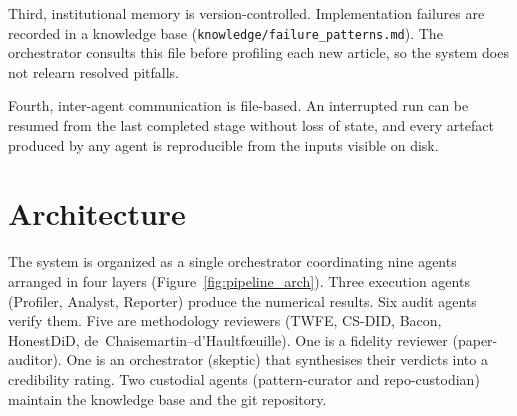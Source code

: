 Third, institutional memory is version-controlled. Implementation failures are recorded in a knowledge base (\texttt{knowledge/failure\_patterns.md}). The orchestrator consults this file before profiling each new article, so the system does not relearn resolved pitfalls.

Fourth, inter-agent communication is file-based. An interrupted run can be resumed from the last completed stage without loss of state, and every artefact produced by any agent is reproducible from the inputs visible on disk.


\section{Architecture}
\label{sec:appc_architecture}

The system is organized as a single orchestrator coordinating nine agents arranged in four layers (Figure~\ref{fig:pipeline_arch}). Three execution agents (Profiler, Analyst, Reporter) produce the numerical results. Six audit agents verify them. Five are methodology reviewers (TWFE, CS-DID, Bacon, HonestDiD, de~Chaisemartin--d'Haultf\oe{}uille). One is a fidelity reviewer (paper-auditor). One is an orchestrator (skeptic) that synthesises their verdicts into a credibility rating. Two custodial agents (pattern-curator and repo-custodian) maintain the knowledge base and the git repository.

